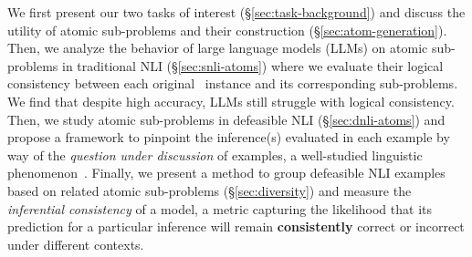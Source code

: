 We first present our two tasks of interest (\S\ref{sec:task-background}) and discuss the utility of atomic sub-problems and their construction (\S\ref{sec:atom-generation}).
%
Then, we analyze the behavior of large language models (LLMs) on atomic sub-problems in traditional NLI (\S\ref{sec:snli-atoms}) where we evaluate their logical consistency between each original \snli~instance and its corresponding sub-problems.
%
We find that despite high accuracy, LLMs still struggle with logical consistency.
%
Then, we study atomic sub-problems in defeasible NLI (\S\ref{sec:dnli-atoms}) and propose a framework to pinpoint the inference(s) evaluated in each example by way of the \textit{question under discussion} of examples, a well-studied linguistic phenomenon~\cite{benz2017questions, wu-etal-2023-qudeval}.
%
Finally, we present a method to group defeasible NLI examples based on related atomic sub-problems (\S\ref{sec:diversity}) and measure the \textit{inferential consistency} of a model, a metric capturing the likelihood that its prediction for a particular inference will remain \textbf{consistently} correct or incorrect under different contexts.